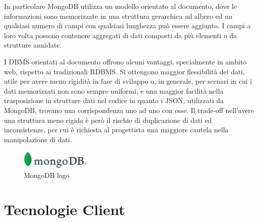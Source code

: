 In particolare MongoDB utilizza un modello orientato al documento, dove le informazioni sono memorizzate in una struttura gerarchica ad albero ed un qualsiasi numero di campi con qualsiasi lunghezza può essere aggiunto. I campi a loro volta possono contenere aggregati di dati composti da più elementi o da strutture annidate.

I DBMS orientati al documento offrono alcuni vantaggi, specialmente in ambito web, rispetto ai tradizionali RDBMS. Si ottengono maggior flessibilità dei dati, utile per avere meno rigidità in fase di sviluppo o, in generale, per scenari in cui i dati memorizzati non sono sempre uniformi, e una maggior facilità nella trasposizione in strutture dati nel codice in quanto i JSON, utilizzati da MongoDB, trovano una corrispondenza uno ad uno con esse. Il trade-off nell'avere una struttura meno rigida è però il rischio di duplicazione di dati ed inconsistenze, per cui è richiesta al progettista una maggiore cautela nella manipolazione di dati.

\begin{figure}[H]
\centering
\includegraphics[width=0.3\textwidth]{img/logos/mongo_logo.png}
\caption{MongoDB logo}
\label{fig:mongodb}
\end{figure}


\section{Tecnologie Client}

